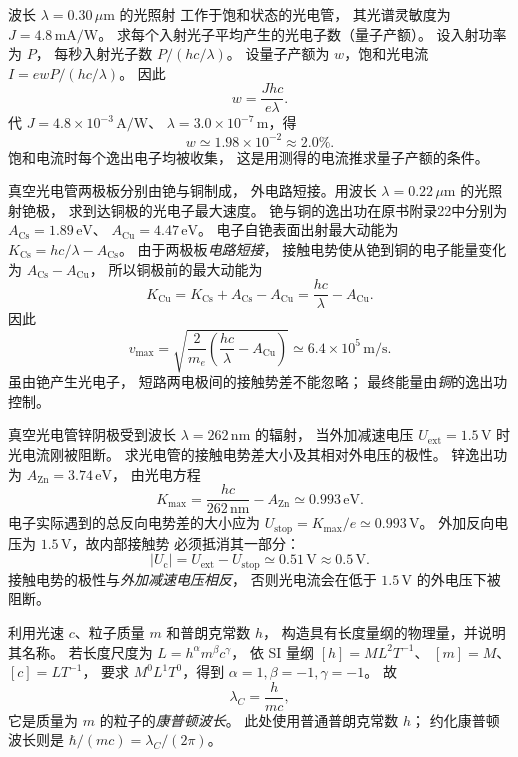波长 $\lambda=0.30\,\mu\mathrm m$ 的光照射
工作于饱和状态的光电管，
其光谱灵敏度为
$J=4.8\,\mathrm{mA/W}$。
求每个入射光子平均产生的光电子数（量子产额）。
\exsolution
设入射功率为 $P$，
每秒入射光子数 $P/(hc/\lambda)$。
设量子产额为 $w$，饱和光电流
$I=e wP/(hc/\lambda)$。
因此
\[
 \boxed{w=\frac{Jhc}{e\lambda}}.
\]
代 $J=4.8\times10^{-3}\,\mathrm{A/W}$、
$\lambda=3.0\times10^{-7}\,\mathrm m$，得
\[
 \boxed{w\simeq1.98\times10^{-2}\approx2.0\%}.
\]
\excheck 饱和电流时每个逸出电子均被收集，
这是用测得的电流推求量子产额的条件。

真空光电管两极板分别由铯与铜制成，
外电路短接。用波长
$\lambda=0.22\,\mu\mathrm m$ 的光照射铯极，
求到达铜极的光电子最大速度。
\exsolution
铯与铜的逸出功在原书附录22中分别为
$A_{\mathrm{Cs}}=1.89\,\mathrm{eV}$、
$A_{\mathrm{Cu}}=4.47\,\mathrm{eV}$。
电子自铯表面出射最大动能为
$K_{\mathrm{Cs}}=hc/\lambda-A_{\mathrm{Cs}}$。
由于两极板\emph{电路短接}，
接触电势使从铯到铜的电子能量变化
为 $A_{\mathrm{Cs}}-A_{\mathrm{Cu}}$，
所以铜极前的最大动能为
\[
 K_{\mathrm{Cu}}=
 K_{\mathrm{Cs}}+A_{\mathrm{Cs}}-A_{\mathrm{Cu}}
 =\frac{hc}{\lambda}-A_{\mathrm{Cu}}.
\]
因此
\[
 \boxed{v_{\max}=\sqrt{\frac{2}{m_e}
 \left(\frac{hc}{\lambda}-A_{\mathrm{Cu}}\right)}
 \simeq6.4\times10^5\,\mathrm{m/s}}.
\]
\excheck 虽由铯产生光电子，
短路两电极间的接触势差不能忽略；
最终能量由\emph{铜}的逸出功控制。

真空光电管锌阴极受到波长
$\lambda=262\,\mathrm{nm}$ 的辐射，
当外加减速电压 $U_{\mathrm{ext}}=1.5\,\mathrm V$
时光电流刚被阻断。
求光电管的接触电势差大小及其相对外电压的极性。
\exsolution
锌逸出功为 $A_{\mathrm{Zn}}=3.74\,\mathrm{eV}$，
由光电方程
\[
 K_{\max}=\frac{hc}{262\,\mathrm{nm}}-A_{\mathrm{Zn}}
 \simeq0.993\,\mathrm{eV}.
\]
电子实际遇到的总反向电势差的大小应为
$U_{\mathrm{stop}}=K_{\max}/e\simeq0.993\,\mathrm V$。
外加反向电压为 $1.5\,\mathrm V$，故内部接触势
必须抵消其一部分：
\[
 \boxed{|U_{\mathrm c}|=
 U_{\mathrm{ext}}-U_{\mathrm{stop}}
 \simeq0.51\,\mathrm V\approx0.5\,\mathrm V}.
\]
\excheck 接触电势的极性与\emph{外加减速电压相反}，
否则光电流会在低于 $1.5\,\mathrm V$ 的外电压下被阻断。

利用光速 $c$、粒子质量 $m$ 和普朗克常数 $h$，
构造具有长度量纲的物理量，并说明其名称。
\exsolution
若长度尺度为 $L=h^\alpha m^\beta c^\gamma$，
依 SI 量纲
$[h]=ML^2T^{-1}$、
$[m]=M$、$[c]=LT^{-1}$，
要求 $M^0L^1T^0$，得到
$\alpha=1,\beta=-1,\gamma=-1$。
故
\[
 \boxed{\lambda_C=\frac{h}{mc}},
\]
它是质量为 $m$ 的粒子的\emph{康普顿波长}。
\excheck 此处使用普通普朗克常数 $h$；
约化康普顿波长则是 $\hbar/(mc)=\lambda_C/(2\pi)$。

